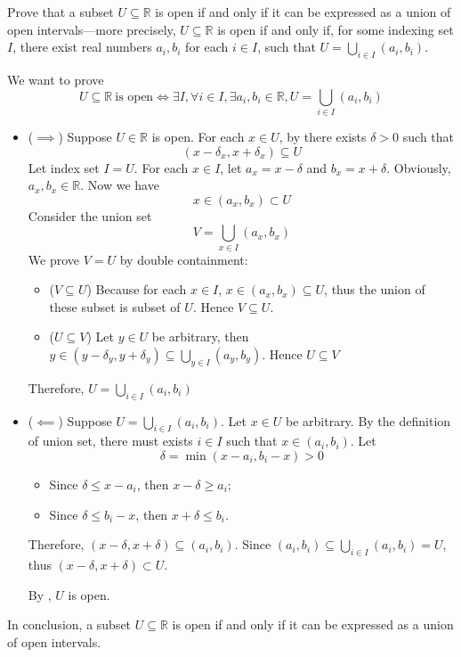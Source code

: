 \begin{chapex}
\label{cqOpenSubsetsOfREnd}
Prove that a subset $U \subseteq \mathbb{R}$ is open if and only if it can be expressed as a union of open intervals---more precisely, $U \subseteq \mathbb{R}$ is open if and only if, for some indexing set $I$, there exist real numbers $a_i, b_i$ for each $i \in I$, such that $U = \bigcup_{i \in I} (a_i, b_i)$.
\end{chapex}

\begin{myproof}
    We want to prove
    \[
    U \subseteq \mathbb{R}\ \text{is open} \iff  \exists I, \forall i \in I, \exists a_i, b_i \in \mathbb{R}, U = \bigcup_{i \in I}(a_i, b_i)
    \]
    \begin{itemize}
        \item ($\implies$) Suppose $U \in \mathbb{R}$ is open. For each $x \in U$, by  there exists $\delta>0$ such that
        \[(x-\delta_x, x+\delta_x) \subseteq U\]
        Let index set $I=U$. For each $x \in I$, let $a_x=x-\delta$ and $b_x=x+\delta$. Obviously, $a_x, b_x \in \mathbb{R}$. Now we have
        \[x \in (a_x, b_x) \subset U\]
        Consider the union set
        \[V = \bigcup_{x \in I}(a_x, b_x)\]
        We prove $V=U$ by double containment:
        \begin{itemize}
            \item ($V \subseteq U$) Because for each $x \in I$, $x \in (a_x, b_x) \subseteq U$, thus the union of these subset is subset of $U$. Hence $V \subseteq U$.
            \item ($U \subseteq V$) Let $y \in U$ be arbitrary, then $y \in (y-\delta_y, y+\delta_y) \subseteq \bigcup_{y \in I}(a_y, b_y)$. Hence $U \subseteq V$ 
        \end{itemize}
        Therefore, $U=\bigcup_{i \in I}(a_i, b_i)$
        \item ($\impliedby$) Suppose $U=\bigcup_{i \in I}(a_i, b_i)$. Let $x \in U$ be arbitrary. By the definition of union set, there must exists $i \in I$ such that $x \in (a_i, b_i)$. Let
        \[\delta=\min(x-a_i, b_i-x)>0\]
        \begin{itemize}
            \item Since $\delta \le x-a_i$, then $x-\delta \ge a_i$;
            \item Since $\delta \le b_i-x$, then $x+\delta \le b_i$.
        \end{itemize}
        Therefore, $(x-\delta, x+\delta) \subseteq (a_i, b_i)$. Since $(a_i, b_i) \subseteq \bigcup_{i \in I}(a_i, b_i) = U$, thus $(x-\delta, x+\delta) \subset U$.
        
        By , $U$ is open.
    \end{itemize}
    In conclusion, a subset $U \subseteq \mathbb{R}$ is open if and only if it can be expressed as a union of open intervals.
\end{myproof}

